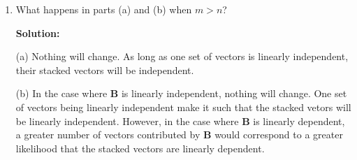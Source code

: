 \begin{enumerate}[label=(\alph*)]
	\item What happens in parts (a) and (b) when $m > n$?

	      \par \textbf{Solution:}
	      \par (a) Nothing will change. As long as one set of vectors is
	      linearly independent, their stacked vectors will be independent.
	      \par (b) In the case where $\mathbf{B}$ is linearly independent,
	      nothing will change. One set of vectors being linearly independent
	      make it such that the stacked vetors will be linearly independent.
	      However, in the case where $\mathbf{B}$ is linearly dependent, a
	      greater number of vectors contributed by $\mathbf{B}$ would correspond
	      to a greater likelihood that the stacked vectors are linearly
	      dependent.

\end{enumerate}
